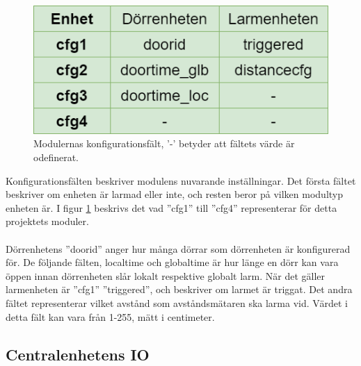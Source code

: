\begin{figure}[h]
    \centering
    \includegraphics[scale=0.5]{dokumentation/projektrapport/IMAGES/cfg_fields.png}
    \caption{Modulernas konfigurationsfält, '-' betyder att fältets värde är odefinerat.}
    \label{fig:cfg}
\end{figure}

Konfigurationsfälten beskriver modulens nuvarande inställningar. Det första fältet beskriver om enheten är larmad eller inte, och resten beror på vilken modultyp enheten är. I figur \ref{fig:cfg} beskrivs det vad ''cfg1'' till ''cfg4'' representerar för detta projektets moduler. \\ \\
Dörrenhetens ''doorid'' anger hur många dörrar som dörrenheten är konfigurerad för. De följande fälten, localtime och globaltime är hur länge en dörr kan vara öppen innan dörrenheten slår lokalt respektive globalt larm. 
När det gäller larmenheten är ''cfg1'' ''triggered'', och beskriver om larmet är triggat. Det andra fältet representerar vilket avstånd som avståndsmätaren ska larma vid. Värdet i detta fält kan vara från 1-255, mätt i centimeter. %

\subsection{Centralenhetens IO}
\label{sec:centralenhetIO}


